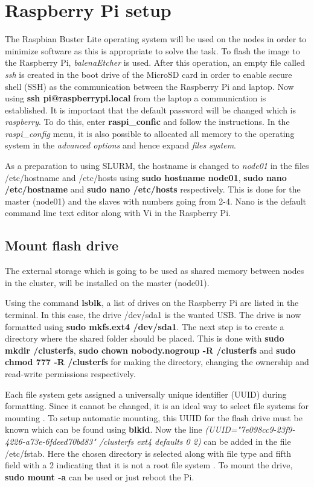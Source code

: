\documentclass[../Head/Report.tex]{subfiles}
\begin{document}
\section{Raspberry Pi setup}
The Raspbian Buster Lite operating system will be used on the nodes in order to minimize software as this is appropriate to solve the task. To flash the image to the Raspberry Pi, \textit{balenaEtcher} is used. After this operation, an empty file called \textit{ssh} is created in the boot drive of the MicroSD card in order to enable secure shell (SSH) as the communication between the Raspberry Pi and laptop. Now using \textbf{ssh pi@raspberrypi.local} from the laptop a communication is established. It is important that the default password will be changed which is \textit{raspberry}. To do this, enter \textbf{raspi\_confic} and follow the instructions. In the \textit{raspi\_config} menu, it is also possible to allocated all memory to the operating system in the \textit{advanced options} and hence expand \textit{files system}.   

As a preparation to using SLURM, the hostname is changed to \textit{node01} in the files /etc/hostname and /etc/hosts using \textbf{sudo hostname node01}, \textbf{sudo nano /etc/hostname} and \textbf{sudo nano /etc/hosts} respectively. This is done for the master (node01) and the slaves with numbers going from 2-4. Nano is the default command line text editor along with Vi in the Raspberry Pi. 

\subsection{Mount flash drive}
The external storage which is going to be used as shared memory between nodes in the cluster, will be installed on the master (node01). 

Using the command \textbf{lsblk}, a list of drives on the Raspberry Pi are listed in the terminal. In this case, the drive /dev/sda1 is the wanted USB. The drive is now formatted using \textbf{sudo mkfs.ext4 /dev/sda1}. The next step is to create a directory where the shared folder should be placed. This is done with \textbf{sudo mkdir /clusterfs}, \textbf{sudo chown nobody.nogroup -R /clusterfs} and \textbf{sudo chmod 777 -R /clusterfs} for making the directory, changing the ownership and read-write permissions respectively. 

Each file system gets assigned a universally unique identifier (UUID) during formatting. Since it cannot be changed, it is an ideal way to select file systems for mounting \cite{fstab}. To setup automatic mounting, this UUID for the flash drive must be known which can be found using \textbf{blkid}. Now the line \textit{(UUID="7e098cc9-23f9-4226-a73e-6fdeed70bd83" /clusterfs ext4 defaults 0 2)} can be added in the file /etc/fstab. Here the chosen directory is selected along with file type and fifth field with a 2 indicating that it is not a root file system \cite{fstab_pass}. To mount the drive, \textbf{sudo mount -a} can be used or just reboot the Pi. 
\end{document}
